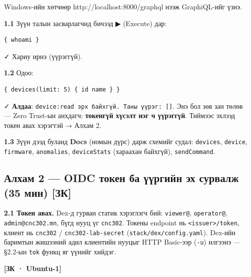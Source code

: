 Windows-ийн хөтчөөр http://localhost:8000/graphql нээж GraphiQL-ийг үзнэ.

\textbf{1.1} Зүүн талын засварлагчид бичээд ▶ (Execute) дар:

\begin{verbatim}
{ whoami }
\end{verbatim}

✓ Хариу ирнэ (үүрэггүй).

\textbf{1.2} Одоо:

\begin{verbatim}
{ devices(limit: 5) { id name } }
\end{verbatim}

✓ \textbf{Алдаа}: \texttt{\textquotesingle{}device:read\textquotesingle{}\ эрх\ байхгүй.\ Таны\ үүрэг:\ {[}{]}}. Энэ бол зөв зан төлөв --- Zero Trust-ын анхдагч: \textbf{токенгүй хүсэлт нэг ч үүрэггүй}. Тиймээс эхлээд токен авах хэрэгтэй → Алхам 2.

\textbf{1.3} Зүүн дээд буланд \textbf{Docs} (номын дүрс) дарж схемийг судал: \texttt{devices}, \texttt{device}, \texttt{firmware}, \texttt{anomalies}, \texttt{deviceStats} (хараахан байхгүй), \texttt{sendCommand}.

\hypertarget{ux430ux43bux445ux430ux43c-2-oidc-ux442ux43eux43aux435ux43d-ux431ux430-ux4afux4afux440ux433ux438ux439ux43d-ux44dux445-ux441ux443ux440ux432ux430ux43bux436-35-ux43cux438ux43d-ux437ux43a}{%
\subsection{Алхам 2 --- OIDC токен ба үүргийн эх сурвалж (35 мин) {[}ЗК{]}}\label{ux430ux43bux445ux430ux43c-2-oidc-ux442ux43eux43aux435ux43d-ux431ux430-ux4afux4afux440ux433ux438ux439ux43d-ux44dux445-ux441ux443ux440ux432ux430ux43bux436-35-ux43cux438ux43d-ux437ux43a}}

\textbf{2.1 Токен авах.} Dex-д гурван статик хэрэглэгч бий: \texttt{viewer@}, \texttt{operator@}, \texttt{admin@cnc302.mn}, бүгд нууц үг \texttt{cnc302}. Токены endpoint нь \texttt{\textless{}issuer\textgreater{}/\allowbreak{}token}, клиент нь \texttt{cnc302} / \texttt{cnc302-lab-secret} (\texttt{stack/\allowbreak{}dex/\allowbreak{}config.\allowbreak{}yaml}). Dex-ийн баримтын жишээний адил клиентийн нууцыг HTTP Basic-ээр (\texttt{-u}) илгээнэ --- §2.2-ын \texttt{tok} функц яг үүнийг хийдэг.

\textbf{{[}ЗК · Ubuntu-1{]}}

\begin{Shaded}
\begin{Highlighting}[]
\KeywordTok{|}  
\VariableTok{)} \KeywordTok{\&\&}  
\end{Highlighting}
\end{Shaded}

